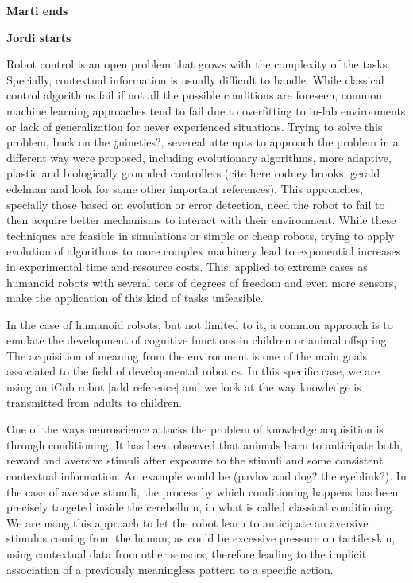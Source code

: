 \documentclass[letterpaper, 10 pt, conference]{ieeeconf}  %
\begin{document}
\textbf{Marti ends}



\textbf{Jordi starts}

Robot control is an open problem that grows with the complexity of the tasks. Specially, contextual information is usually difficult to handle. While classical control algorithms fail if not all the possible conditions are foreseen, common machine learning approaches tend to fail due to overfitting to in-lab environments or lack of generalization for never experienced situations. 
Trying to solve this problem, back on the ¿nineties?, severeal attempts to approach the problem in a different way were proposed, including evolutionary algorithms, more adaptive, plastic and biologically grounded controllers (cite here rodney brooks, gerald edelman and look for some other important references). This approaches, specially those based on evolution or error detection, need the robot to fail to then acquire better mechanisms to interact with their environment. While these techniques are feasible in simulations or simple or cheap robots, trying to apply evolution of algorithms to more complex machinery lead to exponential increases in experimental time and resource costs. This, applied to extreme cases as humanoid robots with several tens of degrees of freedom and even more sensors, make the application of this kind of tasks unfeasible. 

In the case of humanoid robots, but not limited to it, a common approach is to emulate the development of cognitive functions in children or animal offspring. The acquisition of meaning from the environment is one of the main goals associated to the field of developmental robotics. In this specific case, we are using an iCub robot [add reference] and we look at the way knowledge is transmitted from adults to children. 

One of the ways neuroscience attacks the problem of knowledge acquisition is through conditioning. It has been observed that animals learn to anticipate both, reward and aversive stimuli after exposure to the stimuli and some consistent contextual information. An example would be (pavlov and dog? the eyeblink?). In the case of aversive stimuli, the process by which conditioning happens has been precisely targeted inside the cerebellum, in what is called classical conditioning. We are using this approach to let the robot learn to anticipate an aversive stimulus coming from the human, as could be excessive pressure on tactile skin, using contextual data from other sensors, therefore leading to the implicit association of a previously meaningless pattern to a specific action. 
\end{document}
